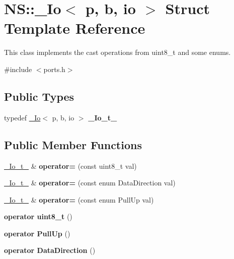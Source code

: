 \hypertarget{structNS_1_1__Io}{}\section{NS\+:\+:\+\_\+\+Io$<$ p, b, io $>$ Struct Template Reference}
\label{structNS_1_1__Io}


This class implements the cast operations from uint8\+\_\+t and some enums.  




{\ttfamily \#include $<$ports.\+h$>$}

\subsection*{Public Types}
\begin{DoxyCompactItemize}
\item 
typedef \hyperlink{structNS_1_1__Io}{\+\_\+\+Io}$<$ p, b, io $>$ {\bfseries \+\_\+\+Io\+\_\+t\+\_\+}\hypertarget{structNS_1_1__Io_a5b4455c91570a7ab842414d3dbcfbd00}{}\label{structNS_1_1__Io_a5b4455c91570a7ab842414d3dbcfbd00}

\end{DoxyCompactItemize}
\subsection*{Public Member Functions}
\begin{DoxyCompactItemize}
\item 
\hyperlink{structNS_1_1__Io}{\+\_\+\+Io\+\_\+t\+\_\+} \& {\bfseries operator=} (const uint8\+\_\+t val)\hypertarget{structNS_1_1__Io_aa7d4546bf1206b725b145576322fe32d}{}\label{structNS_1_1__Io_aa7d4546bf1206b725b145576322fe32d}

\item 
\hyperlink{structNS_1_1__Io}{\+\_\+\+Io\+\_\+t\+\_\+} \& {\bfseries operator=} (const enum Data\+Direction val)\hypertarget{structNS_1_1__Io_af195a96173567206ce7c20474b59225c}{}\label{structNS_1_1__Io_af195a96173567206ce7c20474b59225c}

\item 
\hyperlink{structNS_1_1__Io}{\+\_\+\+Io\+\_\+t\+\_\+} \& {\bfseries operator=} (const enum Pull\+Up val)\hypertarget{structNS_1_1__Io_ab3e05901247f8ca092e722c818750529}{}\label{structNS_1_1__Io_ab3e05901247f8ca092e722c818750529}

\item 
{\bfseries operator uint8\+\_\+t} ()\hypertarget{structNS_1_1__Io_a717e250af6f5d50a5fd28e7549e2ab4a}{}\label{structNS_1_1__Io_a717e250af6f5d50a5fd28e7549e2ab4a}

\item 
{\bfseries operator Pull\+Up} ()\hypertarget{structNS_1_1__Io_a59cbfc07579215fea2f6879e67f9d3f0}{}\label{structNS_1_1__Io_a59cbfc07579215fea2f6879e67f9d3f0}

\item 
{\bfseries operator Data\+Direction} ()\hypertarget{structNS_1_1__Io_ab01d1981d3c3b389eb5baf2ce3583b79}{}\label{structNS_1_1__Io_ab01d1981d3c3b389eb5baf2ce3583b79}

\end{DoxyCompactItemize}
